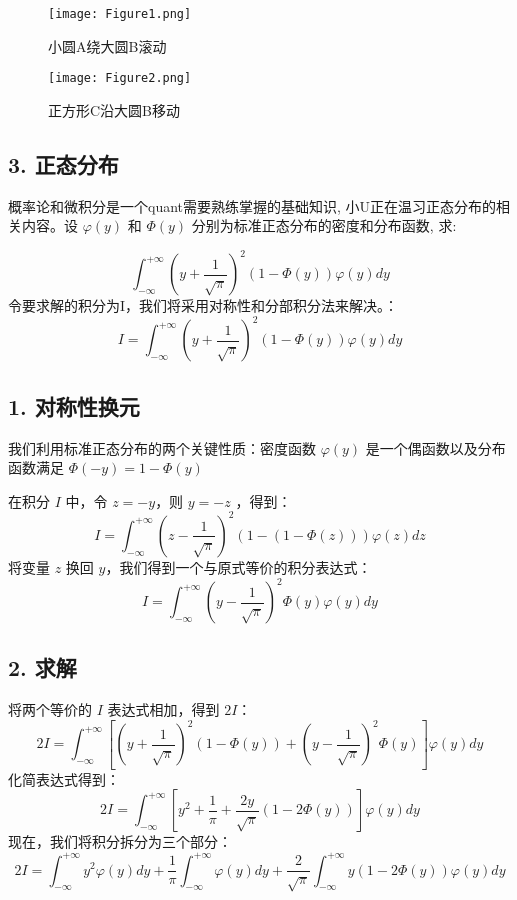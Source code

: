 \documentclass[UTF8]{ctexart}
\begin{document}
\begin{figure}[h!]
    \centering
    \begin{minipage}{0.45\textwidth}
        \centering
        \texttt{[image: Figure1.png]} 
        \caption{小圆A绕大圆B滚动}
        \label{fig:fig1}
    \end{minipage}\hfill
    \begin{minipage}{0.45\textwidth}
        \centering
        \texttt{[image: Figure2.png]}
        \caption{正方形C沿大圆B移动}
        \label{fig:fig2}
    \end{minipage}
\end{figure}


\subsection*{3. 正态分布}
概率论和微积分是一个quant需要熟练掌握的基础知识, 小U正在温习正态分布的相关内容。设 $\varphi(y)$ 和 $\Phi(y)$ 分别为标准正态分布的密度和分布函数, 求:

$$\int_{-\infty}^{+\infty}{\left(y+\frac{1}{\sqrt{\pi}}\right)^{2}(1-\Phi(y))\varphi
  (y)dy}$$
令要求解的积分为I，我们将采用对称性和分部积分法来解决。：
$$ I = \int_{-\infty}^{+\infty}{\left(y+\frac{1}{\sqrt{\pi}}\right)^{2}(1-\Phi(y))\varphi(y)dy} $$

\subsection*{1. 对称性换元}
我们利用标准正态分布的两个关键性质：密度函数 $\varphi(y)$ 是一个偶函数以及分布函数满足 $\Phi(-y) = 1 - \Phi(y)$

在积分 $I$ 中，令 $z = -y$，则 $y = -z$ ，得到：
$$ I = \int_{-\infty}^{+\infty}{\left(z-\frac{1}{\sqrt{\pi}}\right)^{2}(1-(1-\Phi(z)))\varphi(z)dz} $$
将变量 $z$ 换回 $y$，我们得到一个与原式等价的积分表达式：
$$ I = \int_{-\infty}^{+\infty}{\left(y-\frac{1}{\sqrt{\pi}}\right)^{2}\Phi(y)\varphi(y)dy} $$

\subsection*{2. 求解}
将两个等价的 $I$ 表达式相加，得到 $2I$：
$$ 2I = \int_{-\infty}^{+\infty} \left[ \left(y+\frac{1}{\sqrt{\pi}}\right)^{2}(1-\Phi(y)) + \left(y-\frac{1}{\sqrt{\pi}}\right)^{2}\Phi(y) \right] \varphi(y)dy $$
化简表达式得到：
$$ 2I = \int_{-\infty}^{+\infty} \left[ y^2 + \frac{1}{\pi} + \frac{2y}{\sqrt{\pi}}(1-2\Phi(y)) \right] \varphi(y)dy $$
现在，我们将积分拆分为三个部分：
$$ 2I = \int_{-\infty}^{+\infty} y^2 \varphi(y)dy + \frac{1}{\pi}\int_{-\infty}^{+\infty}\varphi(y)dy + \frac{2}{\sqrt{\pi}}\int_{-\infty}^{+\infty} y(1-2\Phi(y))\varphi(y)dy $$
\end{document}
